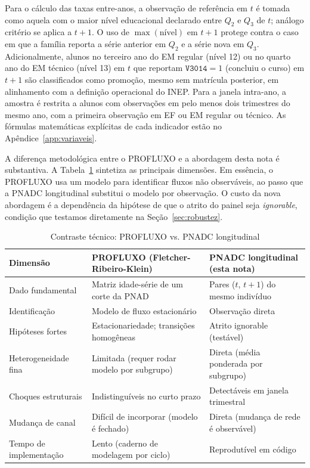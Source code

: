 Para o cálculo das taxas entre-anos, a observação de referência em
$t$ é tomada como aquela com o maior nível educacional declarado
entre $Q_2$ e $Q_3$ de $t$; análogo critério se aplica a $t+1$. O
uso de $\max(\text{nível})$ em $t+1$ protege contra o caso em que
a família reporta a série anterior em $Q_2$ e a série nova em
$Q_3$. Adicionalmente, alunos no terceiro ano do EM regular
(nível 12) ou no quarto ano do EM técnico (nível 13) em $t$ que
reportam $\texttt{V3014}=1$ (concluiu o curso) em $t+1$ são
classificados como promoção, mesmo sem matrícula posterior, em
alinhamento com a definição operacional do INEP. Para a janela
intra-ano, a amostra é restrita a alunos com observações em pelo
menos dois trimestres do mesmo ano, com a primeira observação em
EF ou EM regular ou técnico. As fórmulas matemáticas explícitas
de cada indicador estão no Apêndice~\ref{app:variaveis}.

A diferença metodológica entre o PROFLUXO e a abordagem desta nota
é substantiva. A Tabela~\ref{tab:contraste_profluxo} sintetiza as
principais dimensões. Em essência, o PROFLUXO usa um modelo para
identificar fluxos não observáveis, ao passo que a PNADC longitudinal
substitui o modelo por observação. O custo da nova abordagem é a
dependência da hipótese de que o atrito do painel seja
\emph{ignorable}, condição que testamos diretamente na
Seção~\ref{sec:robustez}.

\begin{table}[htbp]
\centering
\caption{Contraste técnico: PROFLUXO vs. PNADC longitudinal}
\label{tab:contraste_profluxo}
\small
\begin{tabular}{p{4cm} p{5cm} p{5cm}}
\toprule
Dimensão            & PROFLUXO (Fletcher-Ribeiro-Klein)            & PNADC longitudinal (esta nota)              \\
\midrule
Dado fundamental    & Matriz idade-série de um corte da PNAD       & Pares ($t$, $t+1$) do mesmo indivíduo       \\
Identificação       & Modelo de fluxo estacionário                 & Observação direta                            \\
Hipóteses fortes    & Estacionariedade; transições homogêneas      & Atrito ignorable (testável)                  \\
Heterogeneidade fina& Limitada (requer rodar modelo por subgrupo)  & Direta (média ponderada por subgrupo)        \\
Choques estruturais & Indistinguíveis no curto prazo               & Detectáveis em janela trimestral             \\
Mudança de canal    & Difícil de incorporar (modelo é fechado)     & Direta (mudança de rede é observável)        \\
Tempo de implementação & Lento (caderno de modelagem por ciclo)    & Reprodutível em código                       \\
\bottomrule
\end{tabular}
\end{table}

